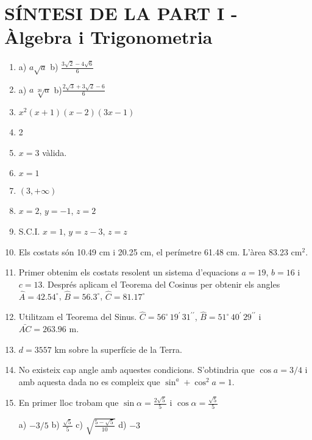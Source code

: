 \section*{SÍNTESI DE LA PART I - Àlgebra i Trigonometria}
\begin{enumerate}
\item a) $a\sqrt{a}$ \quad \quad b) $\frac{3\sqrt{2}-4\sqrt{6}}{6}$

\item a) $a\,\sqrt[20]{a}$ \quad \quad b)$\frac{2\sqrt{3}+3\sqrt{2}-6}{6}$

\item $x^2 (x+1) (x-2) (3x-1)$

\item 2

\item $x=3$ vàlida.

\item $x=1$

\item $(3, +\infty)$

\item $x=2$, $y=-1$, $z=2$

\item S.C.I. $x=1$, $y=z-3$, $z=z$

\item Els costats són 10.49 cm i 20.25 cm, el perímetre 61.48 cm. L'àrea 83.23 cm$^2$.

\item Primer obtenim els costats resolent un sistema d'equacions $a=19$,  $b=16$ i $c=13$. Després aplicam el Teorema del Cosinus per obtenir els angles $\hat A=42.54^\circ$, $\hat B=56.3^\circ$, $\hat C=81.17^\circ$

\item Utilitzam el Teorema del Sinus. $\hat C= 56^\circ \, 19^\prime \, 31^{\prime\prime}$, $\hat B= 51^\circ \, 40^\prime \, 29^{\prime\prime}$ i  $\bar{AC}=263.96$ m.

\item $d=3557$ km sobre la superfície de la Terra.

\item No existeix cap angle amb aquestes condicions. S'obtindria que $\cos a = 3/4$ i amb aquesta dada no es compleix que $\sin^a +\cos^2 a = 1$.

\item En primer lloc trobam que $\sin \alpha = \frac{2\sqrt 5}{5}$ i $\cos \alpha = \frac{\sqrt 5}{5}$ 

a) $-3/5$ \quad   b) $\frac{\sqrt 5}{5}$ \quad  c)  $\sqrt{\frac{5-\sqrt 5}{10}}$ \quad  d) $-3$



\end{enumerate}

